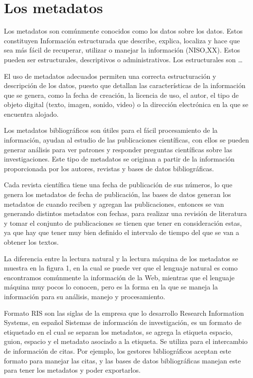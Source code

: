 \section{Los metadatos}
\noindent
Los metadatos son comúnmente conocidos como los datos sobre los datos. Estos constituyen Información estructurada que describe, explica, localiza y hace que sea más fácil de recuperar, utilizar o manejar la información (NISO,XX). Estos pueden ser estructurales, descriptivos o administrativos. Los estructurales son …\parencite{gartner_metadata_2016}\parencite{pomerantz_metadata_2015}


\smallskip
El uso de metadatos adecuados permiten una correcta estructuración y descripción de los datos, puesto que detallan las características de la información que se genera, como la fecha de creación, la licencia de uso, el autor, el tipo de objeto digital (texto, imagen, sonido, video) o la dirección electrónica en la que se encuentra alojado.

\smallskip
Los metadatos bibliográficos son útiles para el fácil procesamiento de la información, ayudan al estudio de las publicaciones científicas, con ellos se pueden generar análisis para ver patrones y responder preguntas científicas sobre las investigaciones. Este tipo de metadatos se originan a partir de la información proporcionada por los autores, revistas y bases de datos bibliográficas.

\smallskip
Cada revista científica tiene una fecha de publicación de sus números, lo que genera los metadatos de fecha de publicación, las bases de datos generan los metadatos de cuando reciben y agregan las publicaciones, entonces se van generando distintos metadatos con fechas, para realizar una revisión de literatura y tomar el conjunto de publicaciones se tienen que tener en consideración estas, ya que hay que tener muy bien definido el intervalo de tiempo del que se van a obtener los textos.

\smallskip
La diferencia entre la lectura natural y la lectura máquina de los metadatos se muestra en la figura 1, en la cual se puede ver que el lenguaje natural es como encontramos comúnmente la información de la Web, mientras que el lenguaje máquina muy pocos lo conocen, pero es la forma en la que se maneja la información para su análisis, manejo y procesamiento. 

\smallskip  
Formato RIS son las siglas de la empresa que lo desarrollo Research Information Systems, en español Sistemas de información de investigación, es un formato de etiquetado en el cual se separan los metadatos, se agrega la etiqueta espacio, guion, espacio y el metadato asociado a la etiqueta. Se utiliza para el intercambio de información de citas. Por ejemplo, los gestores bibliográficos aceptan este formato para manejar las citas, y las bases de datos bibliográficas manejan este para tener los metadatos y poder exportarlos.

